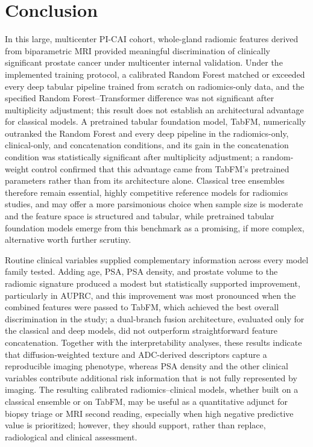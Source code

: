 \documentclass[11pt]{article}
\begin{document}
\section{Conclusion}
\label{sec:conclusion}

In this large, multicenter PI-CAI cohort, whole-gland radiomic features derived
from biparametric MRI provided meaningful discrimination of clinically
significant prostate cancer under multicenter internal validation. Under the
implemented training protocol, a calibrated Random Forest matched or exceeded
every deep tabular pipeline trained from scratch on radiomics-only data, and
the specified Random Forest--Transformer difference was not significant after
multiplicity adjustment; this result does not establish an architectural
advantage for classical models. A pretrained tabular foundation model, TabFM,
numerically outranked the Random Forest and every deep pipeline in the
radiomics-only, clinical-only, and concatenation conditions, and its gain in
the concatenation condition was statistically significant after multiplicity
adjustment; a random-weight control confirmed that this advantage came from
TabFM's pretrained parameters rather than from its architecture alone.
Classical tree ensembles therefore remain essential, highly competitive
reference models for radiomics studies, and may offer a more parsimonious
choice when sample size is moderate and the feature space is structured and
tabular, while pretrained tabular foundation models emerge from this benchmark
as a promising, if more complex, alternative worth further scrutiny.

Routine clinical variables supplied complementary information across every
model family tested. Adding age, PSA, PSA density, and prostate volume to the
radiomic signature produced a modest but statistically supported improvement,
particularly in AUPRC, and this improvement was most pronounced when the
combined features were passed to TabFM, which achieved the best overall
discrimination in the study; a dual-branch fusion architecture, evaluated only
for the classical and deep models, did not outperform straightforward feature
concatenation. Together with the interpretability analyses, these results
indicate that diffusion-weighted texture and ADC-derived descriptors capture a
reproducible imaging phenotype, whereas PSA density and the other clinical
variables contribute additional risk information that is not fully represented
by imaging. The resulting calibrated radiomics--clinical models, whether built
on a classical ensemble or on TabFM, may be useful as a quantitative adjunct for
biopsy triage or MRI second reading, especially when high negative predictive
value is prioritized; however, they should support, rather than replace,
radiological and clinical assessment.
\end{document}
